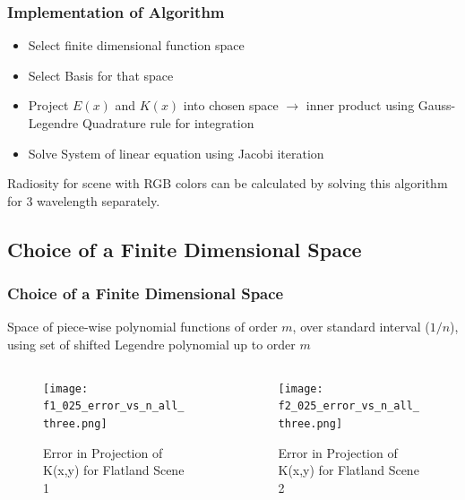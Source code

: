 \begin{frame}\frametitle{Implementation of Algorithm}

\begin{itemize}
\item Select finite dimensional function space 
\item Select Basis for that space
\item Project $E(x)$ and $K(x)$ into chosen space $\rightarrow$ inner product using Gauss-Legendre Quadrature rule for integration
\item Solve System of linear equation using Jacobi iteration
\end{itemize}
Radiosity for scene with RGB colors can be calculated by solving this algorithm for 3 wavelength separately.

\end{frame}
\subsection{Choice of a Finite Dimensional Space}
    \begin{frame}\frametitle{Choice of a Finite Dimensional Space}
        
      Space of piece-wise polynomial functions of order $m$, over standard interval ($1/n$), using set of shifted Legendre polynomial up to order $m$
      \vspace{-7 mm}
      \begin{columns}[T]
         \begin{column}{.5\textwidth}
      
            \begin{figure}
            \centering
            \texttt{[image: f1\_025\_error\_vs\_n\_all\_three.png]}
            \caption{Error in Projection of K(x,y) for Flatland Scene 1}
            \label{fig_e_vs_n_f1}
            \end{figure}
        \end{column}
         \begin{column}{.5\textwidth}

            \begin{figure}
            \centering
            \texttt{[image: f2\_025\_error\_vs\_n\_all\_three.png]}
            \caption{Error in Projection of K(x,y) for Flatland Scene 2}
            \label{fig_e_vs_n_f2}
            \end{figure}
        \end{column}
        \end{columns}
\end{frame}




